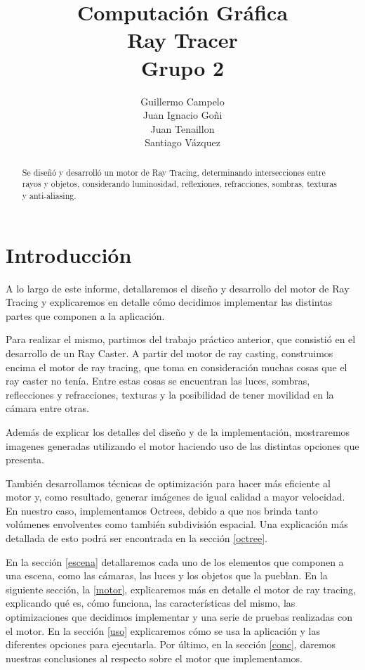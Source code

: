 \documentclass[a4paper,10pt]{article}
\title{Computaci\'on Gr\'afica \\Ray Tracer \\Grupo 2}
\author{Guillermo Campelo\\Juan Ignacio Go\~ni\\Juan Tenaillon\\Santiago
V\'azquez}
\begin{document}
\label{introduccion}

\maketitle

\begin{abstract}
Se dise\~n\'o y desarroll\'o un motor de Ray Tracing, determinando
intersecciones entre rayos y objetos, considerando luminosidad, reflexiones,
refracciones, sombras, texturas y anti-aliasing. 
\end{abstract}

\section{Introducci\'on}
\label{intro}

A lo largo de este informe, detallaremos el dise\~no y desarrollo del motor de
Ray Tracing y explicaremos en detalle c\'omo decidimos implementar las distintas
partes que componen a la aplicaci\'on.

Para realizar el mismo, partimos del trabajo pr\'actico anterior, que
consisti\'o en
el desarrollo de un Ray Caster.  A partir del motor de ray casting,
construimos encima
el motor de ray tracing, que toma en consideraci\'on muchas cosas que el ray
caster no ten\'ia.
Entre estas cosas se encuentran las luces, sombras, reflecciones y refracciones,
texturas y la
posibilidad de tener movilidad en la c\'amara entre otras.

Adem\'as de explicar los detalles del dise\~no y de la implementaci\'on,
mostraremos imagenes generadas utilizando el motor haciendo uso de las distintas
opciones que presenta.

Tambi\'en desarrollamos t\'ecnicas de optimizaci\'on para hacer m\'as eficiente
al motor y, como resultado, generar im\'agenes de igual calidad a mayor
velocidad.  En nuestro caso, implementamos Octrees, debido a que nos brinda
tanto vol\'umenes envolventes como tambi\'en subdivisi\'on espacial.  Una
explicaci\'on m\'as detallada de esto podr\'a ser encontrada en la secci\'on
\ref{octree}.

En la secci\'on \ref{escena} detallaremos cada uno de los elementos que componen
a una escena, como las c\'amaras, las luces y los objetos que la pueblan.  En la
siguiente secci\'on, la \ref{motor}, explicaremos m\'as en detalle el motor de
ray tracing, explicando qu\'e es, c\'omo funciona, las caracter\'isticas del
mismo, las optimizaciones que decidimos implementar y una serie de pruebas
realizadas con el motor.
En la secci\'on \ref{uso} explicaremos c\'omo se usa la aplicaci\'on y las
diferentes opciones para ejecutarla.  Por \'ultimo, en la secci\'on \ref{conc},
daremos nuestras conclusiones al respecto sobre el motor que implementamos.
\end{document}
